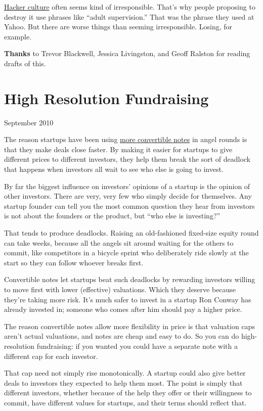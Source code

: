 \documentclass[12pt]{book}
\begin{document}
\href{gba.html}{Hacker culture} often seems kind of irresponsible.
That's why people proposing to destroy it use phrases like ``adult
supervision.'' That was the phrase they used at Yahoo. But there are
worse things than seeming irresponsible. Losing, for example.


\textbf{Thanks} to Trevor Blackwell, Jessica Livingston, and Geoff
Ralston for reading drafts of this.
\chapter{High Resolution Fundraising }

September 2010

The reason startups have been using
\href{http://twitter.com/paulg/status/22319113993}{more convertible
notes} in angel rounds is that they make deals close faster. By making
it easier for startups to give different prices to different investors,
they help them break the sort of deadlock that happens when investors
all wait to see who else is going to invest.

By far the biggest influence on investors' opinions of a startup is the
opinion of other investors. There are very, very few who simply decide
for themselves. Any startup founder can tell you the most common
question they hear from investors is not about the founders or the
product, but ``who else is investing?''

That tends to produce deadlocks. Raising an old-fashioned fixed-size
equity round can take weeks, because all the angels sit around waiting
for the others to commit, like competitors in a bicycle sprint who
deliberately ride slowly at the start so they can follow whoever breaks
first.

Convertible notes let startups beat such deadlocks by rewarding
investors willing to move first with lower (effective) valuations. Which
they deserve because they're taking more risk. It's much safer to invest
in a startup Ron Conway has already invested in; someone who comes after
him should pay a higher price.

The reason convertible notes allow more flexibility in price is that
valuation caps aren't actual valuations, and notes are cheap and easy to
do. So you can do high-resolution fundraising: if you wanted you could
have a separate note with a different cap for each investor.

That cap need not simply rise monotonically. A startup could also give
better deals to investors they expected to help them most. The point is
simply that different investors, whether because of the help they offer
or their willingness to commit, have different values for startups, and
their terms should reflect that.
\end{document}
